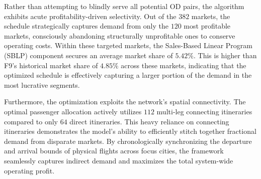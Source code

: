 Rather than attempting to blindly serve all potential OD pairs, the algorithm exhibits acute profitability-driven selectivity. Out of the $382$ markets, the schedule strategically captures demand from only the $120$ most profitable markets, consciously abandoning structurally unprofitable ones to conserve operating costs. Within these targeted markets, the Sales-Based Linear Program (SBLP) component secures an average market share of $5.42\%$. This is higher than F9's historical market share of $4.85\%$ across these markets, indicating that the optimized schedule is effectively capturing a larger portion of the demand in the most lucrative segments.

Furthermore, the optimization exploits the network's spatial connectivity. The optimal passenger allocation actively utilizes $112$ multi-leg connecting itineraries compared to only $64$ direct itineraries. This heavy reliance on connecting itineraries demonstrates the model's ability to efficiently stitch together fractional demand from disparate markets. By chronologically synchronizing the departure and arrival bounds of physical flights across focus cities, the \algoNotation framework seamlessly captures indirect demand and maximizes the total system-wide operating profit.